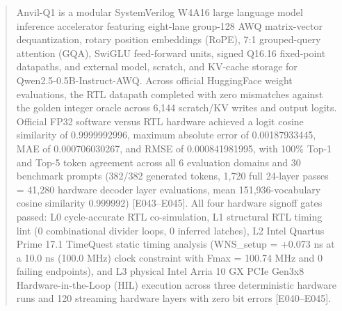 \documentclass[11pt,a4paper]{article}
\begin{document}
\renewcommand{\abstractname}{\textcolor{vulcanblue}{Abstract}}\begin{abstract}\noindent Anvil-Q1 is a modular SystemVerilog W4A16 large language model inference accelerator featuring eight-lane group-128 AWQ matrix-vector dequantization,\allowbreak{} rotary position embeddings (\allowbreak{}RoPE)\allowbreak{},\allowbreak{} 7:1 grouped-query attention (\allowbreak{}GQA)\allowbreak{},\allowbreak{} SwiGLU feed-forward units,\allowbreak{} signed Q16.16 fixed-point datapaths,\allowbreak{} and external model,\allowbreak{} scratch,\allowbreak{} and KV-cache storage for Qwen2.5-0.5B-Instruct-AWQ. Across official HuggingFace weight evaluations,\allowbreak{} the RTL datapath completed with zero mismatches against the golden integer oracle across 6,\allowbreak{}144 scratch/\allowbreak{}KV writes and output logits. Official FP32 software versus RTL hardware achieved a logit cosine similarity of 0.9999992996,\allowbreak{} maximum absolute error of 0.00187933445,\allowbreak{} MAE of 0.000706030267,\allowbreak{} and RMSE of 0.000841981995,\allowbreak{} with 100\% Top-1 and Top-5 token agreement across all 6 evaluation domains and 30 benchmark prompts (\allowbreak{}382/\allowbreak{}382 generated tokens,\allowbreak{} 1,\allowbreak{}720 full 24-layer passes =\allowbreak{} 41,\allowbreak{}280 hardware decoder layer evaluations,\allowbreak{} mean 151,\allowbreak{}936-vocabulary cosine similarity 0.999992)\allowbreak{} [\allowbreak{}E043–E045]\allowbreak{}. All four hardware signoff gates passed: L0 cycle-accurate RTL co-simulation,\allowbreak{} L1 structural RTL timing lint (\allowbreak{}0 combinational divider loops,\allowbreak{} 0 inferred latches)\allowbreak{},\allowbreak{} L2 Intel Quartus Prime 17.1 TimeQuest static timing analysis (\allowbreak{}WNS\_\allowbreak{}setup =\allowbreak{} +\allowbreak{}0.073 ns at a 10.0 ns (\allowbreak{}100.0 MHz)\allowbreak{} clock constraint with Fmax =\allowbreak{} 100.74 MHz and 0 failing endpoints)\allowbreak{},\allowbreak{} and L3 physical Intel Arria 10 GX PCIe Gen3x8 Hardware-in-the-Loop (\allowbreak{}HIL)\allowbreak{} execution across three deterministic hardware runs and 120 streaming hardware layers with zero bit errors [\allowbreak{}E040–E045]\allowbreak{}.\par{}\end{abstract}\vspace{2pt}
\end{document}
